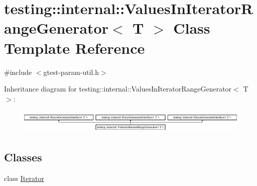 \hypertarget{classtesting_1_1internal_1_1_values_in_iterator_range_generator}{}\section{testing\+::internal\+::Values\+In\+Iterator\+Range\+Generator$<$ T $>$ Class Template Reference}
\label{classtesting_1_1internal_1_1_values_in_iterator_range_generator}


{\ttfamily \#include $<$gtest-\/param-\/util.\+h$>$}

Inheritance diagram for testing\+::internal\+::Values\+In\+Iterator\+Range\+Generator$<$ T $>$\+:\begin{figure}[H]
\begin{center}
\leavevmode
\includegraphics[height=1.155831cm]{db/dbc/classtesting_1_1internal_1_1_values_in_iterator_range_generator}
\end{center}
\end{figure}
\subsection*{Classes}
\begin{DoxyCompactItemize}
\item 
class \mbox{\hyperlink{classtesting_1_1internal_1_1_values_in_iterator_range_generator_1_1_iterator}{Iterator}}
\end{DoxyCompactItemize}
